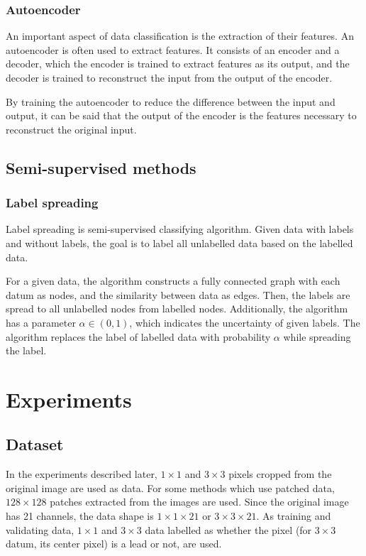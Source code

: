 \documentclass{article}
\begin{document}
        \subsubsection{Autoencoder}
            An important aspect of data classification is
            the extraction of their features.
            An autoencoder \cite{autoencoder} is often used to extract features.
            It consists of an encoder and a decoder,
            which the encoder is trained to extract features as its output,
            and the decoder is trained to reconstruct the input from the output of the encoder.

            By training the autoencoder to reduce the difference between the input and output,
            it can be said that the output of the encoder is the features necessary to reconstruct the original input.

    \subsection{Semi-supervised methods}
        \subsubsection{Label spreading}
            Label spreading \cite{label} is semi-supervised classifying algorithm.
            Given data with labels and without labels,
            the goal is to label all unlabelled data based on the labelled data.

            For a given data, the algorithm constructs a
            fully connected graph with each datum as nodes,
            and the similarity between data as edges.
            Then, the labels are spread to all unlabelled nodes from labelled nodes.
            Additionally, the algorithm has a parameter
            $\alpha \in (0, 1)$, which indicates the uncertainty of given labels.
            The algorithm replaces the label of labelled data
            with probability $\alpha$ while spreading the label.

\section{Experiments} \label{sec:experiments}
    \subsection{Dataset}
        In the experiments described later,
        $1\times 1$ and $3\times 3$ pixels cropped from the original image
        are used as data.
        For some methods which use patched data,
        $128\times 128$ patches extracted from the images are used.
        Since the original image has 21 channels,
        the data shape is $1\times 1\times 21$ or $3\times 3\times 21$.
        As training and validating data,
        $1\times 1$ and $3\times 3$ data labelled as whether
        the pixel (for $3\times 3$ datum, its center pixel)
        is a lead or not, are used.
\end{document}
